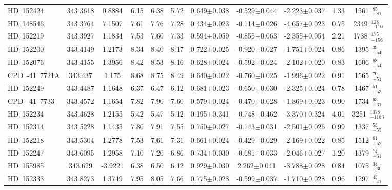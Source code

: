 {\begin{longtable}{lcccccccccc}
HD~152424 & 343.3618 & 0.8884 & 6.15 & 6.38 & 5.72 & 0.649$\pm$0.038 & -0.529$\pm$0.044 & -2.223$\pm$0.037 & 1.33 & 1561~$_{-81}^{85}$ \\
\noalign{\smallskip}
HD~148546 & 343.3764 & 7.1507 & 7.61 & 7.76 & 7.28 & 0.434$\pm$0.023 & -0.114$\pm$0.026 & -4.657$\pm$0.023 & 0.75 & 2349~$_{-110}^{128}$ \\
\noalign{\smallskip}
HD~152219 & 343.3927 & 1.1834 & 7.53 & 7.60 & 7.33 & 0.594$\pm$0.059 & -0.855$\pm$0.063 & -2.355$\pm$0.054 & 2.21 & 1738~$_{-156}^{175}$ \\
\noalign{\smallskip}
HD~152200 & 343.4149 & 1.2173 & 8.34 & 8.40 & 8.17 & 0.722$\pm$0.025 & -0.920$\pm$0.027 & -1.751$\pm$0.024 & 0.86 & 1395~$_{-54}^{39}$ \\
\noalign{\smallskip}
HD~152076 & 343.4155 & 1.3956 & 8.42 & 8.53 & 8.16 & 0.628$\pm$0.024 & -0.592$\pm$0.024 & -2.102$\pm$0.020 & 0.83 & 1606~$_{-54}^{68}$ \\
\noalign{\smallskip}
CPD~-41~7721A & 343.437 & 1.175 & 8.68 & 8.75 & 8.49 & 0.640$\pm$0.022 & -0.760$\pm$0.025 & -1.996$\pm$0.022 & 0.91 & 1565~$_{-51}^{70}$ \\
\noalign{\smallskip}
HD~152249 & 343.4487 & 1.1648 & 6.37 & 6.47 & 6.12 & 0.681$\pm$0.023 & -0.650$\pm$0.030 & -2.325$\pm$0.024 & 0.78 & 1467~$_{-53}^{51}$ \\
\noalign{\smallskip}
CPD~-41~7733 & 343.4572 & 1.1654 & 7.82 & 7.90 & 7.60 & 0.579$\pm$0.024 & -0.470$\pm$0.028 & -1.869$\pm$0.023 & 0.90 & 1734~$_{-61}^{63}$ \\
\noalign{\smallskip}
HD~152234 & 343.4628 & 1.2155 & 5.42 & 5.47 & 5.12 & 0.195$\pm$0.341 & -0.748$\pm$0.462 & -3.370$\pm$0.324 & 4.01 & 3251~$_{-1183}^{1378}$ \\
\noalign{\smallskip}
HD~152314 & 343.5228 & 1.1435 & 7.80 & 7.91 & 7.55 & 0.750$\pm$0.027 & -0.143$\pm$0.031 & -2.501$\pm$0.026 & 0.99 & 1337~$_{-55}^{53}$ \\
\noalign{\smallskip}
HD~152218 & 343.5304 & 1.2778 & 7.53 & 7.61 & 7.31 & 0.661$\pm$0.024 & -0.429$\pm$0.029 & -2.169$\pm$0.022 & 0.85 & 1512~$_{-52}^{61}$ \\
\noalign{\smallskip}
HD~152247 & 343.6095 & 1.2958 & 7.10 & 7.20 & 6.86 & 0.734$\pm$0.030 & -0.681$\pm$0.033 & -2.046$\pm$0.027 & 1.20 & 1379~$_{-61}^{74}$ \\
\noalign{\smallskip}
HD~155985 & 343.629 & -3.9221 & 6.38 & 6.50 & 6.12 & 0.929$\pm$0.030 & 2.262$\pm$0.041 & -3.788$\pm$0.028 & 0.84 & 1075~$_{-30}^{34}$ \\
\noalign{\smallskip}
HD~152333 & 343.8273 & 1.3749 & 7.95 & 8.05 & 7.66 & 0.775$\pm$0.028 & -0.599$\pm$0.037 & -1.710$\pm$0.028 & 0.96 & 1297~$_{-41}^{43}$ \\

\end{longtable}}
